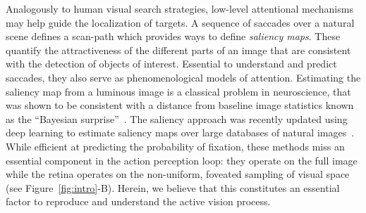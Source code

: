 Analogously to human visual search strategies, low-level attentional mechanisms may help guide the localization of targets. A sequence of saccades over a natural scene defines a scan-path which provides ways to define \emph{saliency maps}. These quantify the attractiveness of the different parts of an image that are consistent with the detection of objects of interest. Essential to understand and predict saccades, they also serve as phenomenological models of attention. Estimating the saliency map from a luminous image is a classical problem in neuroscience, that was shown to be consistent with a distance from baseline image statistics known as the ``Bayesian surprise''~\cite{Itti01}. The saliency approach was recently updated using deep learning to estimate saliency maps over large databases of natural images~\cite{Kummerer17}. While efficient at predicting the probability of fixation, these methods miss an essential component in the action perception loop: they operate on the full image while the retina operates on the non-uniform, foveated sampling of visual space (see Figure~\ref{fig:intro}-B). Herein, we believe that this constitutes an essential factor to reproduce and understand the active vision process.

